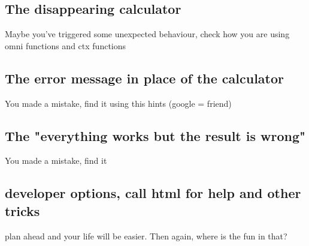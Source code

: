 \subsection{The disappearing calculator}
\label{sub:noCalc}
Maybe you've triggered some unexpected behaviour, check how you are using omni functions and ctx functions

\subsection{The error message in place of the calculator}
\label{sub:errorMsg}
You made a mistake, find it using this hints (google = friend)

\subsection{The "everything works but the result is wrong"}
\label{sub:yourMistake}
You made a mistake, find it

\subsection{developer options, call html for help and other tricks}
\label{sub:debug}
plan ahead and your life will be easier. Then again, where is the fun in that?


